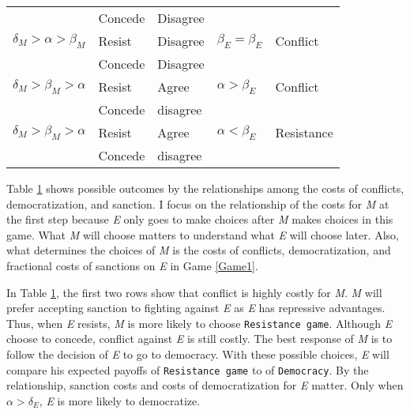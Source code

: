 \documentclass[11pt]{article}
\begin{document}
\begin{table}[!ht]
\begin{tabular}{ p{3cm} p{2cm} p{2cm} p{3cm} p{3cm} }
	     	                                  & Concede  & Disagree &                           &                \\
		$\delta_{M} > \alpha > \beta_{M}$ & Resist   & Disagree & $\beta_{E} = \beta_{E}$   & Conflict \\
	                                        & Concede  & Disagree &                           &                \\
		$\delta_{M} > \beta_{M} > \alpha$	& Resist   & Agree    & $\alpha > \beta_{E}$  & Conflict         \\
		                                      & Concede  & disagree &                           &                \\
    $\delta_{M} > \beta_{M} > \alpha$	& Resist   & Agree    & $\alpha < \beta_{E}$  & Resistance     \\
		                                      & Concede  & disagree &                           &                \\
		\bottomrule
	\end{tabular}
	{\raggedright }
	\label{tab:table1}
\end{table}

Table \ref{tab:table1} shows possible outcomes by the relationships among the costs of conflicts, democratization, and sanction. I focus on the relationship of the costs for \textit{M} at the first step because \textit{E} only goes to make choices after \textit{M} makes choices in this game. What \textit{M} will choose matters to understand what \textit{E} will choose later. Also, what determines the choices of \textit{M} is the costs of conflicts, democratization, and fractional costs of sanctions on \textit{E} in Game \ref{Game1}.

In Table \ref{tab:table1}, the first two rows show that conflict is highly costly for \textit{M}. \textit{M} will prefer accepting sanction to fighting against \textit{E} as \textit{E} has repressive advantages. Thus, when \textit{E} resists, \textit{M} is more likely to choose \texttt{Resistance game}. Although \textit{E} choose to concede, conflict against \textit{E} is still costly. The best response of \textit{M} is to follow the decision of \textit{E} to go to democracy. With these possible choices, \textit{E} will compare his expected payoffs of \texttt{Resistance game} to of \texttt{Democracy}. By the relationship, sanction costs and costs of democratization for \textit{E} matter. Only when $\alpha > \delta_{E}$, \textit{E} is more likely to democratize.
\end{document}
